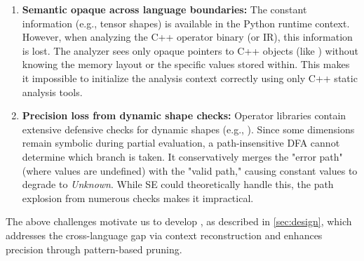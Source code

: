 \begin{enumerate}
    \item \textbf{Semantic opaque across language boundaries:} 
    The constant information (e.g., tensor shapes) is available in the Python runtime context. However, when analyzing the C++ operator binary (or IR), this information is lost. The analyzer sees only opaque pointers to C++ objects (like ) without knowing the memory layout or the specific values stored within. This makes it impossible to initialize the analysis context correctly using only C++ static analysis tools.
    
    \item \textbf{Precision loss from dynamic shape checks:} 
    Operator libraries contain extensive defensive checks for dynamic shapes (e.g., ). 
    Since some dimensions remain symbolic during partial evaluation, a path-insensitive DFA cannot determine which branch is taken. It conservatively merges the "error path" (where values are undefined) with the "valid path," causing constant values to degrade to \textit{Unknown}. While SE could theoretically handle this, the path explosion from numerous checks makes it impractical.
\end{enumerate}

The above challenges motivate us to develop \mysys, as described in \autoref{sec:design}, which addresses the cross-language gap via context reconstruction and enhances precision through pattern-based pruning.

